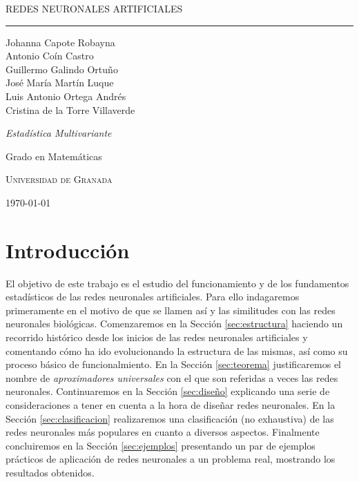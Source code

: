 \documentclass[
  a4paper,
  12pt,
  spanish,
]{scrartcl}
\DeclareRobustCommand{\spacedallcaps}[1]{{\linespread{1.3}\sacshape\MakeTextUppercase{#1}}}%
\theoremstyle{teorema-style}
\newcommand{\horrule}[1]{\rule{\linewidth}{#1}}
\begin{document}
\begin{titlepage}
  \vspace*{4cm}

  \begin{flushleft}
    \Huge
    \spacedallcaps{Redes neuronales artificiales}
    \horrule{2pt}
  \end{flushleft}

  \vspace{2em}

  \begin{flushright}
    \large
    Johanna Capote Robayna\\
    Antonio Coín Castro\\
    Guillermo Galindo Ortuño\\
    José María Martín Luque\\
    Luis Antonio Ortega Andrés\\
    Cristina de la Torre Villaverde
    \vspace{1em}

    \textit{Estadística Multivariante}

    Grado en Matemáticas

    \textsc{Universidad de Granada}\vspace{1em}

    \today\vspace{.5em}
  \end{flushright}
\end{titlepage}

\newpage

{\hypersetup{hidelinks}
\tableofcontents
}

\newpage

\section{Introducción}

El objetivo de este trabajo es el estudio del funcionamiento y de los fundamentos estadísticos de las redes neuronales artificiales.
Para ello indagaremos primeramente en el motivo de que se llamen así y las similitudes con las redes neuronales biológicas. Comenzaremos en la Sección \ref{sec:estructura} haciendo un recorrido histórico desde los inicios de las redes neuronales artificiales y comentando cómo ha ido evolucionando la estructura de las mismas, así como su proceso básico de funcionalmiento. En la Sección \ref{sec:teorema} justificaremos el nombre de \textit{aproximadores universales} con el que son referidas a veces las redes neuronales. Continuaremos en la Sección \ref{sec:diseño} explicando una serie de consideraciones a tener en cuenta a la hora de diseñar redes neuronales. En la Sección \ref{sec:clasificacion} realizaremos una clasificación (no exhaustiva) de las redes neuronales más populares en cuanto a diversos aspectos. Finalmente concluiremos en la Sección \ref{sec:ejemplos} presentando un par de ejemplos prácticos de aplicación de redes neuronales a un problema real, mostrando los resultados obtenidos.
\end{document}
